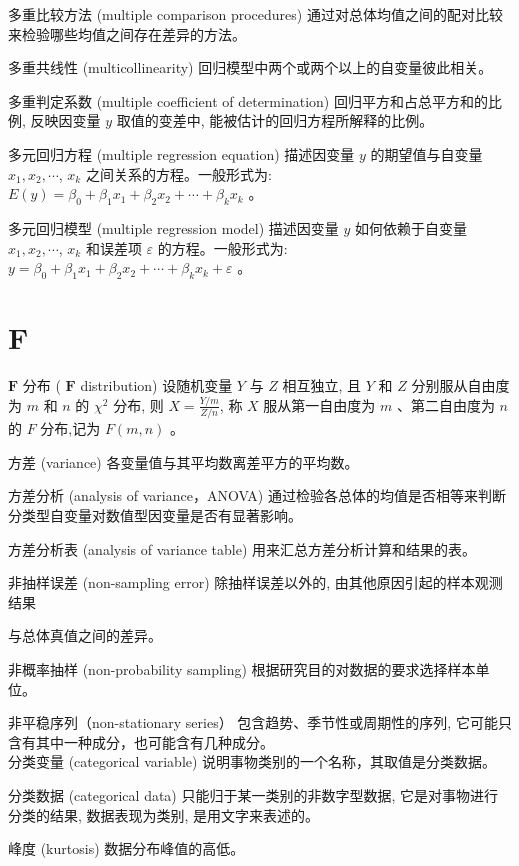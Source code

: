 \documentclass[10pt]{article}
\begin{document}
\begin{CJK*}{UTF8}{bsmi}
多重比较方法 (multiple comparison procedures) 通过对总体均值之间的配对比较来检验哪些均值之间存在差异的方法。

多重共线性 (multicollinearity) 回归模型中两个或两个以上的自变量彼此相关。

多重判定系数 (multiple coefficient of determination) 回归平方和占总平方和的比例, 反映因变量 $y$ 取值的变差中, 能被估计的回归方程所解释的比例。

多元回归方程 (multiple regression equation) 描述因变量 $y$ 的期望值与自变量 $x_{1}, x_{2}, \cdots$, $x_{k}$ 之间关系的方程。一般形式为: $E(y)=\beta_{0}+\beta_{1} x_{1}+\beta_{2} x_{2}+\cdots+\beta_{k} x_{k}$ 。

多元回归模型 (multiple regression model) 描述因变量 $y$ 如何依赖于自变量 $x_{1}, x_{2}, \cdots$, $x_{k}$ 和误差项 $\varepsilon$ 的方程。一般形式为: $y=\beta_{0}+\beta_{1} x_{1}+\beta_{2} x_{2}+\cdots+\beta_{k} x_{k}+\varepsilon$ 。

\section*{F}
$\boldsymbol{F}$ 分布 ( $\boldsymbol{F}$ distribution) 设随机变量 $Y$ 与 $Z$ 相互独立, 且 $Y$ 和 $Z$ 分别服从自由度为 $m$ 和 $n$ 的 $\chi^{2}$ 分布, 则 $X=\frac{Y / m}{Z / n}$, 称 $X$ 服从第一自由度为 $m$ 、第二自由度为 $n$ 的 $F$ 分布,记为 $F(m, n)$ 。

方差 (variance) 各变量值与其平均数离差平方的平均数。

方差分析 (analysis of variance，ANOVA) 通过检验各总体的均值是否相等来判断分类型自变量对数值型因变量是否有显著影响。

方差分析表 (analysis of variance table) 用来汇总方差分析计算和结果的表。

非抽样误差 (non-sampling error) 除抽样误差以外的, 由其他原因引起的样本观测结果

与总体真值之间的差异。

非概率抽样 (non-probability sampling) 根据研究目的对数据的要求选择样本单位。

非平稳序列（non-stationary series） 包含趋势、季节性或周期性的序列, 它可能只含有其中一种成分，也可能含有几种成分。\\
分类变量 (categorical variable) 说明事物类别的一个名称，其取值是分类数据。

分类数据 (categorical data) 只能归于某一类别的非数字型数据, 它是对事物进行分类的结果, 数据表现为类别, 是用文字来表述的。

峰度 (kurtosis) 数据分布峰值的高低。


\end{CJK*}
\end{document}
